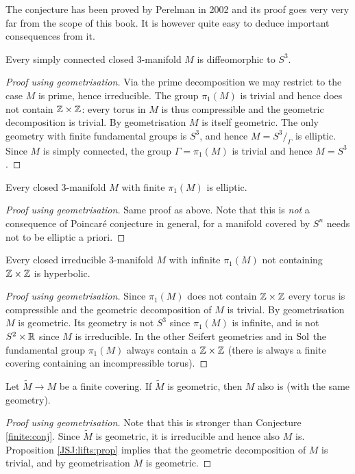 The conjecture has been proved by Perelman in 2002 and its proof goes very very far from the scope of this book. It is however quite easy to deduce important consequences from it.

\begin{conj} \label{Poincare:conj}
Every simply connected closed 3-manifold $M$ is diffeomorphic to $S^3$.
\end{conj}
\begin{proof}[Proof using geometrisation]
Via the prime decomposition we may restrict to the case $M$ is prime, hence irreducible. The group $\pi_1(M)$ is trivial and hence does not contain $\mathbb{Z} \times \mathbb{Z}$: every torus in $M$ is thus compressible and the geometric decomposition is trivial. By geometrisation $M$ is itself geometric. The only geometry with finite fundamental groups is $S^3$, and hence $M= S^3/_\Gamma$ is elliptic. Since $M$ is simply connected, the group $\Gamma = \pi_1(M)$ is trivial and hence $M=S^3$.
\end{proof}

\begin{conj}[Elliptisation]  \label{finite:conj}
Every closed 3-manifold $M$ with finite $\pi_1(M)$ is elliptic.
\end{conj}
\begin{proof}[Proof using geometrisation]
Same proof as above. Note that this is \emph{not} a consequence of Poincar\'e conjecture in general, for a manifold covered by $S^n$ needs not to be elliptic a priori.
\end{proof}

\begin{conj}[Hyperbolisation] \label{hyperbolisation:conj}
Every closed irreducible 3-manifold $M$ with infinite $\pi_1(M)$ not containing $\mathbb{Z} \times \mathbb{Z}$ is hyperbolic.
\end{conj}
\begin{proof}[Proof using geometrisation]
Since $\pi_1(M)$ does not contain $\mathbb{Z}\times \mathbb{Z}$ every torus is compressible and the geometric decomposition of $M$ is trivial. By geometrisation $M$ is geometric. Its geometry is not $S^3$ since $\pi_1(M)$ is infinite, and is not $S^2\times \mathbb{R}$ since $M$ is irreducible. In the other Seifert geometries and in ${\rm Sol}$ the fundamental group $\pi_1(M)$ always contain a $\mathbb{Z}\times \mathbb{Z}$ (there is always a finite covering containing an incompressible torus).
\end{proof}

\begin{cor} 
Let $\tilde M \to M$ be a finite covering. If $\tilde M$ is geometric, then $M$ also is (with the same geometry).
\end{cor}
\begin{proof}[Proof using geometrisation]
Note that this is stronger than Conjecture \ref{finite:conj}. 
Since $\tilde M$ is geometric, it is irreducible and hence also $M$ is. Proposition \ref{JSJ:lifts:prop} implies that the geometric decomposition of $M$ is trivial, and by geometrisation $M$ is geometric.
\end{proof}

